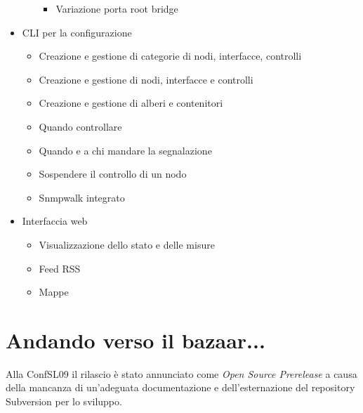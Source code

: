 \documentclass[a4wide,10pt,italian]{manual}
\begin{document}
\begin{itemize}
\begin{itemize}
\begin{itemize}
\item {} 
Variazione porta root bridge

\end{itemize}

\end{itemize}

\item {} 
CLI per la configurazione
\begin{itemize}
\item {} 
Creazione e gestione di categorie di nodi, interfacce, controlli

\item {} 
Creazione e gestione di nodi, interfacce e controlli

\item {} 
Creazione e gestione di alberi e contenitori

\item {} 
Quando controllare

\item {} 
Quando e a chi mandare la segnalazione

\item {} 
Sospendere il controllo di un nodo

\item {} 
Snmpwalk integrato

\end{itemize}

\item {} 
Interfaccia web
\begin{itemize}
\item {} 
Visualizzazione dello stato e delle misure

\item {} 
Feed RSS

\item {} 
Mappe

\end{itemize}

\end{itemize}


\section{Andando verso il bazaar...}

Alla ConfSL09 il rilascio è stato annunciato come \emph{Open Source Prerelease}
a causa della mancanza di un'adeguata documentazione e dell'esternazione
del repository Subversion per lo sviluppo.
\end{document}
